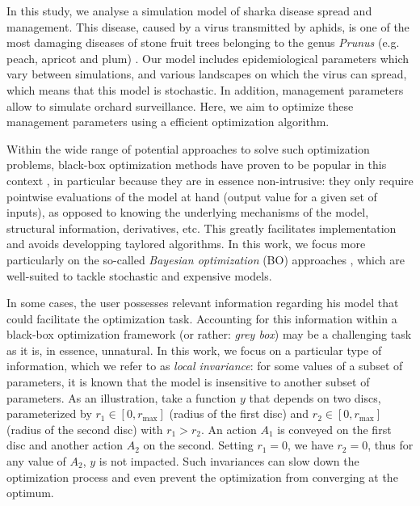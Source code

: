 In this study, we analyse a simulation model of sharka disease spread and management. This disease, caused by a virus transmitted by aphids, is one of the most damaging diseases of stone fruit trees belonging to the genus \textit{Prunus} (e.g. peach, apricot and plum) \cite{cambra2006plum,rimbaud2015sharka}.
Our model includes epidemiological parameters which vary between simulations, and various landscapes on which the virus can spread, which means that this model is stochastic. 
In addition, management parameters allow to simulate orchard surveillance. Here, we aim to optimize these management parameters using a efficient optimization algorithm.

Within the wide range of potential approaches to solve such optimization problems, black-box optimization methods have proven to be popular in this context \cite{rios2013derivative}, 
in particular because they are in essence non-intrusive: they only require pointwise evaluations of the model at hand (output value for a given set of inputs), 
as opposed to knowing the underlying mechanisms of the model, structural information, derivatives, etc. This greatly facilitates implementation and avoids developping taylored algorithms.
In this work, we focus more particularly on the so-called \textit{Bayesian optimization} (BO) approaches \cite{mockus2012bayesian,shahriari2016taking},
which are well-suited to tackle stochastic and expensive models.

In some cases, the user possesses relevant information regarding his model that could facilitate the optimization task.
Accounting for this information within a black-box optimization framework (or rather: \textit{grey box}) may be a challenging task
as it is, in essence, unnatural. In this work, we focus on a particular type of information, which we refer to as \textit{local invariance}:
for some values of a subset of parameters, it is known that the model is insensitive to another subset of parameters. 
As an illustration, take a function $y$ that depends on two discs, parameterized by $r_1 \in [0, r_{\max}]$ (radius of the first disc) and $r_2 \in [0, r_{\max}]$ (radius of the second disc) with $r_1 > r_2$. An action $A_1$ is conveyed on the first disc and another action $A_2$ on the second. Setting $r_1=0$, we have $r_2=0$, thus for any value of $A_2$, $y$ is not impacted. Such invariances can slow down the optimization process and even prevent the optimization from converging at the optimum.  

